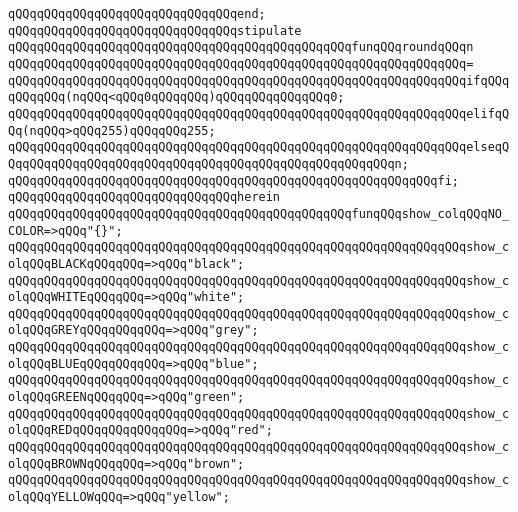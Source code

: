 \verb|qQQqqQQqqQQqqQQqqQQqqQQqqQQqqQQqend;|\newline
\newline
\verb|qQQqqQQqqQQqqQQqqQQqqQQqqQQqqQQqstipulate|\newline
\verb|qQQqqQQqqQQqqQQqqQQqqQQqqQQqqQQqqQQqqQQqqQQqqQQqfunqQQqroundqQQqn|\newline
\verb|qQQqqQQqqQQqqQQqqQQqqQQqqQQqqQQqqQQqqQQqqQQqqQQqqQQqqQQqqQQqqQQq=|\newline
\verb|qQQqqQQqqQQqqQQqqQQqqQQqqQQqqQQqqQQqqQQqqQQqqQQqqQQqqQQqqQQqqQQqifqQQqqQQqqQQq(nqQQq<qQQq0qQQqqQQq)qQQqqQQqqQQqqQQq0;|\newline
\verb|qQQqqQQqqQQqqQQqqQQqqQQqqQQqqQQqqQQqqQQqqQQqqQQqqQQqqQQqqQQqqQQqelifqQQq(nqQQq>qQQq255)qQQqqQQq255;|\newline
\verb|qQQqqQQqqQQqqQQqqQQqqQQqqQQqqQQqqQQqqQQqqQQqqQQqqQQqqQQqqQQqqQQqelseqQQqqQQqqQQqqQQqqQQqqQQqqQQqqQQqqQQqqQQqqQQqqQQqqQQqqQQqn;|\newline
\verb|qQQqqQQqqQQqqQQqqQQqqQQqqQQqqQQqqQQqqQQqqQQqqQQqqQQqqQQqqQQqfi;|\newline
\verb|qQQqqQQqqQQqqQQqqQQqqQQqqQQqqQQqherein|\newline
\verb|qQQqqQQqqQQqqQQqqQQqqQQqqQQqqQQqqQQqqQQqqQQqqQQqfunqQQqshow_colqQQqNO_COLOR=>qQQq"{}";|\newline
\verb|qQQqqQQqqQQqqQQqqQQqqQQqqQQqqQQqqQQqqQQqqQQqqQQqqQQqqQQqqQQqqQQqshow_colqQQqBLACKqQQqqQQq=>qQQq"black";|\newline
\verb|qQQqqQQqqQQqqQQqqQQqqQQqqQQqqQQqqQQqqQQqqQQqqQQqqQQqqQQqqQQqqQQqshow_colqQQqWHITEqQQqqQQq=>qQQq"white";|\newline
\verb|qQQqqQQqqQQqqQQqqQQqqQQqqQQqqQQqqQQqqQQqqQQqqQQqqQQqqQQqqQQqqQQqshow_colqQQqGREYqQQqqQQqqQQq=>qQQq"grey";|\newline
\verb|qQQqqQQqqQQqqQQqqQQqqQQqqQQqqQQqqQQqqQQqqQQqqQQqqQQqqQQqqQQqqQQqshow_colqQQqBLUEqQQqqQQqqQQq=>qQQq"blue";|\newline
\verb|qQQqqQQqqQQqqQQqqQQqqQQqqQQqqQQqqQQqqQQqqQQqqQQqqQQqqQQqqQQqqQQqshow_colqQQqGREENqQQqqQQq=>qQQq"green";|\newline
\verb|qQQqqQQqqQQqqQQqqQQqqQQqqQQqqQQqqQQqqQQqqQQqqQQqqQQqqQQqqQQqqQQqshow_colqQQqREDqQQqqQQqqQQqqQQq=>qQQq"red";|\newline
\verb|qQQqqQQqqQQqqQQqqQQqqQQqqQQqqQQqqQQqqQQqqQQqqQQqqQQqqQQqqQQqqQQqshow_colqQQqBROWNqQQqqQQq=>qQQq"brown";|\newline
\verb|qQQqqQQqqQQqqQQqqQQqqQQqqQQqqQQqqQQqqQQqqQQqqQQqqQQqqQQqqQQqqQQqshow_colqQQqYELLOWqQQq=>qQQq"yellow";|\newline
